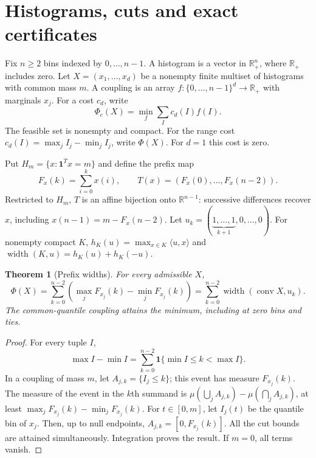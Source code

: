 \documentclass[11pt]{article}
\newtheorem{theorem}{Theorem}[section]
\theoremstyle{definition}\newtheorem{definition}[theorem]{Definition}
\newcommand{\R}{\mathbb R}
\newcommand{\1}{\mathbf 1}
\newcommand{\conv}{\operatorname{conv}}
\newcommand{\width}{\operatorname{width}}
\begin{document}
\section{Histograms, cuts and exact certificates}
Fix $n\ge2$ bins indexed by $0,\ldots,n-1$. A histogram is a vector in
$\R_+^n$, where $\R_+$ includes zero. Let $X=(x_1,\ldots,x_d)$ be a nonempty
finite multiset of histograms with common mass $m$. A coupling is an array
$f\colon\{0,\ldots,n-1\}^d\to\R_+$ with marginals $x_j$. For a cost $c_d$,
write
\[
 \Phi_c(X)=\min_f\sum_I c_d(I)f(I).
\]
The feasible set is nonempty and compact. For the range cost
$c_d(I)=\max_j I_j-\min_j I_j$, write $\Phi(X)$. For $d=1$ this cost is zero.

Put $H_m=\{x:\1^Tx=m\}$ and define the prefix map
\[
 F_x(k)=\sum_{i=0}^k x(i),\qquad
 T(x)=(F_x(0),\ldots,F_x(n-2)).
\]
Restricted to $H_m$, $T$ is an affine bijection onto $\R^{n-1}$: successive
differences recover $x$, including $x(n-1)=m-F_x(n-2)$. Let
$u_k=(\underbrace{1,\ldots,1}_{k+1},0,\ldots,0)$. For nonempty compact $K$,
$h_K(u)=\max_{x\in K}\langle u,x\rangle$ and
$\width(K,u)=h_K(u)+h_K(-u)$.

\begin{theorem}[Prefix widths]\label{thm:width}
For every admissible $X$,
\begin{equation}\label{eq:width}
 \Phi(X)=\sum_{k=0}^{n-2}\left(\max_j F_{x_j}(k)-\min_j F_{x_j}(k)\right)
        =\sum_{k=0}^{n-2}\width(\conv X,u_k).
\end{equation}
The common-quantile coupling attains the minimum, including at zero bins and ties.
\end{theorem}
\begin{proof}
For every tuple $I$,
\[
 \max I-\min I=\sum_{k=0}^{n-2}\1\{\min I\le k<\max I\}.
\]
In a coupling of mass $m$, let $A_{j,k}=\{I_j\le k\}$; this event has measure
$F_{x_j}(k)$. The measure of the event in the $k$th summand is
$\mu(\bigcup_j A_{j,k})-\mu(\bigcap_j A_{j,k})$, at least
$\max_j F_{x_j}(k)-\min_j F_{x_j}(k)$.
For $t\in[0,m]$, let $I_j(t)$ be the quantile bin of $x_j$. Then, up to null
endpoints, $A_{j,k}=[0,F_{x_j}(k)]$. All the cut bounds are attained
simultaneously. Integration proves the result. If $m=0$, all terms vanish.
\end{proof}
\end{document}

